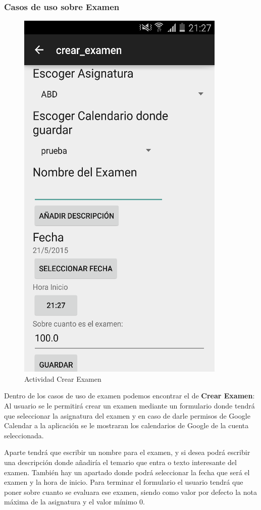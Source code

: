 \subsubsection{Casos de uso sobre Examen}
\label{subsubsecc:Casos de uso sobre Examen}
\begin{figure} 
  \begin{center}
    \includegraphics{figs/crearExamen.png}
  \end{center}
  \caption{Actividad Crear Examen}
\end{figure}
Dentro de los casos de uso de examen podemos encontrar el de \textbf{Crear Examen}:
Al usuario se le permitirá crear un examen mediante un formulario donde tendrá que seleccionar la asignatura del examen y en caso de darle permisos de Google Calendar a la aplicación se le mostraran los calendarios de Google de la cuenta seleccionada.

Aparte tendrá que escribir un nombre para el examen,  y si desea podrá escribir una descripción donde añadiría el temario que entra o texto interesante del examen.
También hay un apartado donde podrá seleccionar la fecha que será el examen y la hora de inicio.
Para terminar el formulario el usuario tendrá que poner sobre cuanto se evaluara ese examen, siendo como valor por defecto la nota máxima de la asignatura y el valor mínimo 0.

